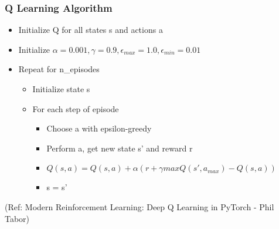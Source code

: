 \begin{frame}[fragile]\frametitle{Q Learning Algorithm}

\begin{itemize}
\item Initialize Q for all states s and actions a 
\item Initialize $\alpha=0.001,\gamma=0.9,\epsilon_{max}=1.0,\epsilon_{min}=0.01$
\item Repeat for n\_episodes
	\begin{itemize}
	\item Initialize state s 
	\item For each step of episode
		\begin{itemize}
		\item Choose a with epsilon-greedy 
		\item Perform a, get new state s’ and reward r 
		\item $Q(s ,a)=Q(s,a)+ \alpha (r + \gamma max Q(s' ,a_{max})- Q(s ,a))$
		\item s = s'
		\end{itemize}
	\end{itemize}
\end{itemize}

{\tiny (Ref: Modern Reinforcement Learning: Deep Q Learning in PyTorch - Phil Tabor)}

\end{frame}
